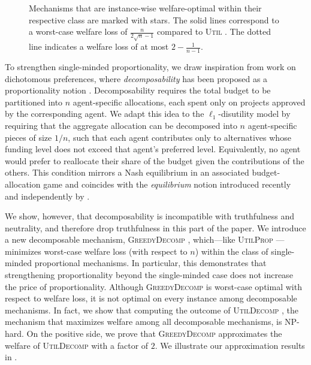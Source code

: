 \documentclass[11pt]{article}
\newcommand{\Ut}{\textsc{Util} }
\newcommand{\UtP}{\textsc{UtilProp} }
\newcommand{\GrdDec}{\textsc{GreedyDecomp} }
\newcommand{\UtDec}{\textsc{UtilDecomp} }
\begin{document}
\begin{figure}
{}

    \caption{Mechanisms that are instance-wise welfare-optimal within their respective class are marked with stars. The solid lines correspond to a worst-case welfare loss of $\frac{n}{2\sqrt{n}-1}$ compared to \Ut. The dotted line indicates a welfare loss of at most $2 - \frac{1}{n-1}$.}\label{fig:intro}
\end{figure}


To strengthen single-minded proportionality, we draw inspiration from work on dichotomous preferences, where \emph{decomposability} has been proposed as a proportionality notion \cite{brandl2021distribution}. Decomposability requires the total budget to be partitioned into $n$ agent-specific allocations, each spent only on projects approved by the corresponding agent. 
We adapt this idea to the $\ell_1$-disutility model by requiring that the aggregate allocation can be decomposed into $n$ agent-specific pieces of size $1/n$, such that each agent contributes only to alternatives whose funding level does not exceed that agent's preferred level. Equivalently, no agent would prefer to reallocate their share of the budget given the contributions of the others. This condition mirrors a Nash equilibrium in an associated budget-allocation game and coincides with the \emph{equilibrium} notion introduced recently and independently by \citet{becker2025efficiently}.

We show, however, that decomposability is incompatible with truthfulness and neutrality, and therefore drop truthfulness in this part of the paper. We introduce a new decomposable mechanism, \GrdDec, which---like \UtP---minimizes worst-case welfare loss (with respect to $n$) within the class of single-minded proportional mechanisms. In particular, this demonstrates that strengthening proportionality beyond the single-minded case does not increase the price of proportionality. Although \GrdDec is worst-case optimal with respect to welfare loss, it is not optimal on every instance among decomposable mechanisms. In fact, we show that computing the outcome of \UtDec, the mechanism that maximizes welfare among all decomposable mechanisms, is NP-hard. On the positive side, we prove that \GrdDec approximates the welfare of \UtDec with a factor of $2$. We illustrate our approximation results in . 
\end{document}
